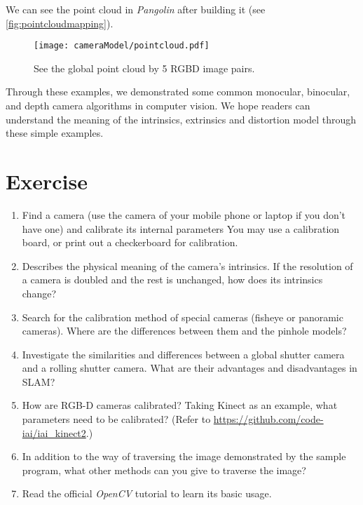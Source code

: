 We can see the point cloud in \textit{Pangolin} after building it (see \autoref{fig:pointcloudmapping}).

\begin{figure}[!t]
    \centering
    \texttt{[image: cameraModel/pointcloud.pdf]}
    \caption{See the global point cloud by 5 RGBD image pairs.}
    \label{fig:pointcloudmapping}
\end{figure}

Through these examples, we demonstrated some common monocular, binocular, and depth camera algorithms in computer vision. We hope readers can understand the meaning of the intrinsics, extrinsics and distortion model through these simple examples.

\section * {Exercise}
\begin{enumerate}
\item[\optional] Find a camera (use the camera of your mobile phone or laptop if you don't have one) and calibrate its internal parameters You may use a calibration board, or print out a checkerboard for calibration.
\item Describes the physical meaning of the camera's intrinsics. If the resolution of a camera is doubled and the rest is unchanged, how does its intrinsics change?
\item Search for the calibration method of special cameras (fisheye or panoramic cameras). Where are the differences between them and the pinhole models? 
\item Investigate the similarities and differences between a global shutter camera and a rolling shutter camera. What are their advantages and disadvantages in SLAM?
\item How are RGB-D cameras calibrated? Taking Kinect as an example, what parameters need to be calibrated? (Refer to \url{https://github.com/code-iai/iai_kinect2}.)
\item In addition to the way of traversing the image demonstrated by the sample program, what other methods can you give to traverse the image?
\item[\optional] Read the official \textit{OpenCV} tutorial to learn its basic usage.
\end{enumerate}

